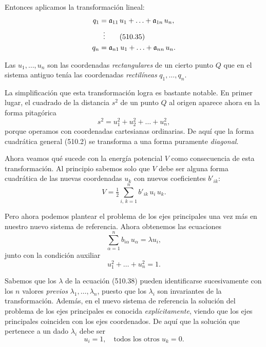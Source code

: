 \documentclass[12pt,a4paper]{book}
\begin{document}
Entonces aplicamos la transformación lineal:
\begin{align}
q_1 &= \mathfrak{a}_{11}\,u_1 + \ldots + \mathfrak{a}_{1n}\,u_n, \notag \\
&\;\;\vdots \tag{510.35} \\
q_n &= \mathfrak{a}_{n1}\,u_1 + \ldots + \mathfrak{a}_{nn}\,u_n. \notag
\end{align}

Las $u_1, \ldots, u_n$ son las coordenadas \textit{rectangulares} de un cierto punto $Q$ que en el sistema antiguo tenía las coordenadas \textit{rectilíneas} $q_1, \ldots, q_n$.

La simplificación que esta transformación logra es bastante notable. En primer lugar, el cuadrado de la distancia $s^2$ de un punto $Q$ al origen aparece ahora en la forma pitagórica
\begin{equation}
s^2 = u_1^2 + u_2^2 + \ldots + u_n^2, \tag{510.36}
\end{equation}
porque operamos con coordenadas cartesianas ordinarias. De aquí que la forma cuadrática general (510.2) se transforma a una forma puramente \textit{diagonal}.

Ahora veamos qué sucede con la energía potencial $V$ como consecuencia de esta transformación. Al principio sabemos solo que $V$ debe ser alguna forma cuadrática de las nuevas coordenadas $u_k$ con nuevos coeficientes $b'_{ik}$:
\begin{equation}
V = \tfrac{1}{2} \sum_{i,\,k=1}^{n} b'_{ik}\,u_i\,u_k. \tag{510.37}
\end{equation}


Pero ahora podemos plantear el problema de los ejes principales una vez más en nuestro nuevo sistema de referencia. Ahora obtenemos las ecuaciones
\begin{equation}
\sum_{\alpha=1}^{n} b_{i\alpha}\,u_\alpha = \lambda u_i, \tag{510.38}
\end{equation}
junto con la condición auxiliar
\begin{equation}
u_1^2 + \ldots + u_n^2 = 1. \tag{510.39}
\end{equation}

Sabemos que los $\lambda$ de la ecuación (510.38) pueden identificarse sucesivamente con los $n$ valores \textit{previos} $\lambda_1, \ldots, \lambda_n$, puesto que los $\lambda_i$ son invariantes de la transformación. Además, en el nuevo sistema de referencia la solución del problema de los ejes principales es conocida \textit{explícitamente}, viendo que los ejes principales coinciden con los ejes coordenados. De aquí que la solución que pertenece a un dado $\lambda_i$ debe ser
\begin{equation}
u_i = 1, \quad \text{todos los otros } u_k = 0. \tag{510.40}
\end{equation}
\end{document}

